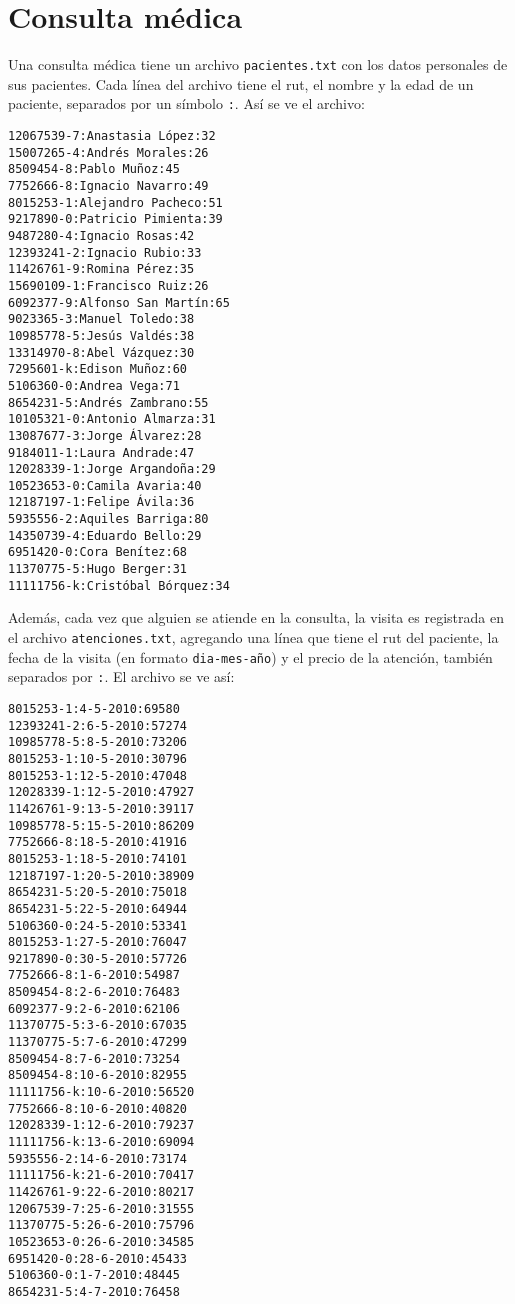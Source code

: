 \section{Consulta médica}

Una consulta médica tiene un archivo \lstinline!pacientes.txt! con los
datos personales de sus pacientes. Cada línea del archivo tiene el rut,
el nombre y la edad de un paciente, separados por un símbolo
\lstinline!:!. Así se ve el archivo:

\begin{lstlisting}
12067539-7:Anastasia López:32
15007265-4:Andrés Morales:26
8509454-8:Pablo Muñoz:45
7752666-8:Ignacio Navarro:49
8015253-1:Alejandro Pacheco:51
9217890-0:Patricio Pimienta:39
9487280-4:Ignacio Rosas:42
12393241-2:Ignacio Rubio:33
11426761-9:Romina Pérez:35
15690109-1:Francisco Ruiz:26
6092377-9:Alfonso San Martín:65
9023365-3:Manuel Toledo:38
10985778-5:Jesús Valdés:38
13314970-8:Abel Vázquez:30
7295601-k:Edison Muñoz:60
5106360-0:Andrea Vega:71
8654231-5:Andrés Zambrano:55
10105321-0:Antonio Almarza:31
13087677-3:Jorge Álvarez:28
9184011-1:Laura Andrade:47
12028339-1:Jorge Argandoña:29
10523653-0:Camila Avaria:40
12187197-1:Felipe Ávila:36
5935556-2:Aquiles Barriga:80
14350739-4:Eduardo Bello:29
6951420-0:Cora Benítez:68
11370775-5:Hugo Berger:31
11111756-k:Cristóbal Bórquez:34
\end{lstlisting}

Además, cada vez que alguien se atiende en la consulta, la visita es
registrada en el archivo \lstinline!atenciones.txt!, agregando una línea
que tiene el rut del paciente, la fecha de la visita (en formato
\lstinline!dia-mes-año!) y el precio de la atención, también separados
por \lstinline!:!. El archivo se ve así:

\begin{lstlisting}
8015253-1:4-5-2010:69580
12393241-2:6-5-2010:57274
10985778-5:8-5-2010:73206
8015253-1:10-5-2010:30796
8015253-1:12-5-2010:47048
12028339-1:12-5-2010:47927
11426761-9:13-5-2010:39117
10985778-5:15-5-2010:86209
7752666-8:18-5-2010:41916
8015253-1:18-5-2010:74101
12187197-1:20-5-2010:38909
8654231-5:20-5-2010:75018
8654231-5:22-5-2010:64944
5106360-0:24-5-2010:53341
8015253-1:27-5-2010:76047
9217890-0:30-5-2010:57726
7752666-8:1-6-2010:54987
8509454-8:2-6-2010:76483
6092377-9:2-6-2010:62106
11370775-5:3-6-2010:67035
11370775-5:7-6-2010:47299
8509454-8:7-6-2010:73254
8509454-8:10-6-2010:82955
11111756-k:10-6-2010:56520
7752666-8:10-6-2010:40820
12028339-1:12-6-2010:79237
11111756-k:13-6-2010:69094
5935556-2:14-6-2010:73174
11111756-k:21-6-2010:70417
11426761-9:22-6-2010:80217
12067539-7:25-6-2010:31555
11370775-5:26-6-2010:75796
10523653-0:26-6-2010:34585
6951420-0:28-6-2010:45433
5106360-0:1-7-2010:48445
8654231-5:4-7-2010:76458
\end{lstlisting}

